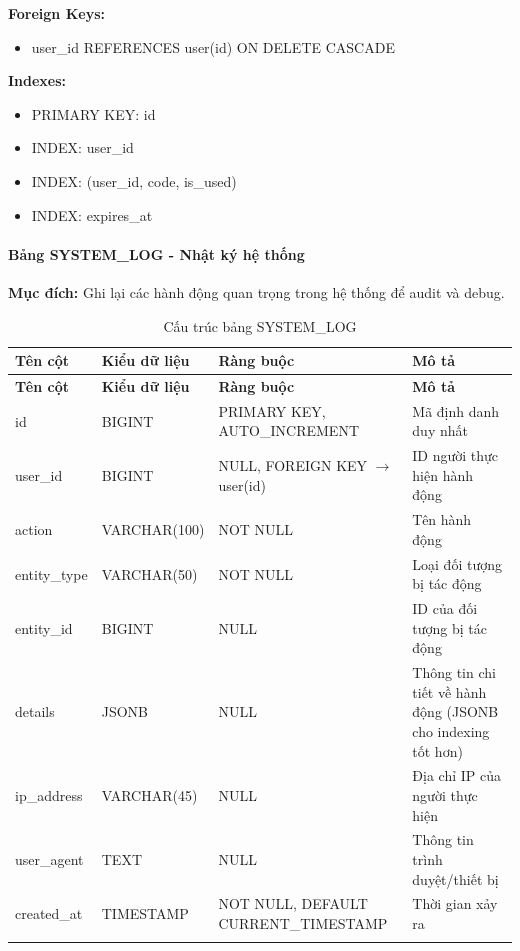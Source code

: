 \textbf{Foreign Keys:}
\begin{itemize}
    \item user\_id REFERENCES user(id) ON DELETE CASCADE
\end{itemize}

\textbf{Indexes:}
\begin{itemize}
    \item PRIMARY KEY: id
    \item INDEX: user\_id
    \item INDEX: (user\_id, code, is\_used)
    \item INDEX: expires\_at
\end{itemize}

\paragraph{Bảng SYSTEM\_LOG - Nhật ký hệ thống}
\textbf{Mục đích:} Ghi lại các hành động quan trọng trong hệ thống để audit và debug.

\small
\begin{longtable}{|>{\raggedright\arraybackslash}p{3.5cm}|>{\raggedright\arraybackslash}p{3cm}|>{\raggedright\arraybackslash}p{4cm}|>{\raggedright\arraybackslash}p{4cm}|}
\hline
\textbf{Tên cột} & \textbf{Kiểu dữ liệu} & \textbf{Ràng buộc} & \textbf{Mô tả} \\
\hline
\endfirsthead
\hline
\textbf{Tên cột} & \textbf{Kiểu dữ liệu} & \textbf{Ràng buộc} & \textbf{Mô tả} \\
\hline
\endhead
id & BIGINT & PRIMARY KEY, AUTO\_INCREMENT & Mã định danh duy nhất \\
\hline
user\_id & BIGINT & NULL, FOREIGN KEY $\rightarrow$ user(id) & ID người thực hiện hành động \\
\hline
action & VARCHAR(100) & NOT NULL & Tên hành động \\
\hline
entity\_type & VARCHAR(50) & NOT NULL & Loại đối tượng bị tác động \\
\hline
entity\_id & BIGINT & NULL & ID của đối tượng bị tác động \\
\hline
details & JSONB & NULL & Thông tin chi tiết về hành động (JSONB cho indexing tốt hơn) \\
\hline
ip\_address & VARCHAR(45) & NULL & Địa chỉ IP của người thực hiện \\
\hline
user\_agent & TEXT & NULL & Thông tin trình duyệt/thiết bị \\
\hline
created\_at & TIMESTAMP & NOT NULL, DEFAULT CURRENT\_TIMESTAMP & Thời gian xảy ra \\
\hline
\caption{Cấu trúc bảng SYSTEM\_LOG}
\end{longtable}

